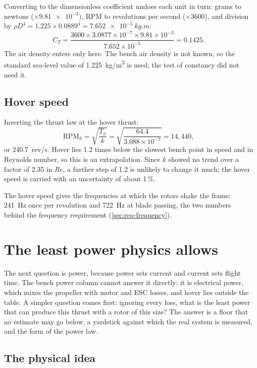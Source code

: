 Converting to the dimensionless coefficient undoes each unit in turn: grams to newtons ($\times\num{9.81e-3}$), RPM to revolutions per second ($\times 3600$), and division by $\rho D^4 = 1.225 \times 0.0889^4 = \SI{7.652e-5}{kg.m}$:
\begin{equation}
C_T = \frac{3600 \times 3.0877\times10^{-7} \times 9.81\times10^{-3}}{7.652\times10^{-5}} = 0.1425.
\end{equation}
The air density enters only here. The bench air density is not known, so the standard sea-level value of \SI{1.225}{kg/m^3} is used; the test of constancy did not need it.

\subsection{Hover speed}

Inverting the thrust law at the hover thrust:
\begin{equation}
\text{RPM}_h = \sqrt{\frac{T_h}{k}} = \sqrt{\frac{64.4}{3.088\times10^{-7}}} = 14{,}440,
\end{equation}
or \SI{240.7}{rev/s}. Hover lies 1.2 times below the slowest bench point in speed and in Reynolds number, so this is an extrapolation. Since $k$ showed no trend over a factor of 2.35 in $Re$, a further step of 1.2 is unlikely to change it much; the hover speed is carried with an uncertainty of about 1\,\%.

The hover speed gives the frequencies at which the rotors shake the frame: \SI{241}{Hz} once per revolution and \SI{722}{Hz} at blade passing, the two numbers behind the frequency requirement (\cref{sec:req-frequency}).

\section{The least power physics allows}\label{sec:sizing-momentum}

The next question is power, because power sets current and current sets flight time. The bench power column cannot answer it directly: it is electrical power, which mixes the propeller with motor and ESC losses, and hover lies outside the table. A simpler question comes first: ignoring every loss, what is the least power that can produce this thrust with a rotor of this size? The answer is a floor that no estimate may go below, a yardstick against which the real system is measured, and the form of the power law.

\subsection{The physical idea}

